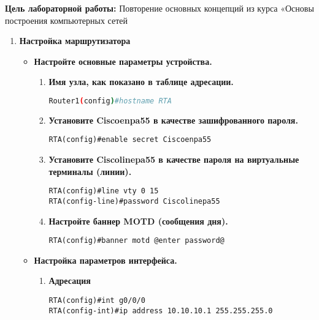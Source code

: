 \documentclass[a4paper,14pt]{extarticle}
\begin{document}
    \textbf{Цель лабораторной работы:}
    Повторение основных концепций из курса «Основы построения компьютерных сетей
    

    \begin{enumerate}
        \item \textbf{Настройка маршрутизатора}
        \begin{itemize}
                \item \textbf{Настройте основные параметры устройства.}
                \begin{enumerate}
                        \item \textbf{Имя узла, как показано в таблице адресации.} 
                                \begin{lstlisting}[language=bash]
Router1(config)#hostname RTA
                                \end{lstlisting}
                        \item \textbf{Установите Ciscoenpa55 в качестве зашифрованного пароля.} 
                                \begin{lstlisting}
RTA(config)#enable secret Ciscoenpa55 
                                \end{lstlisting}
                        \item \textbf{Установите Ciscolinepa55 в качестве пароля на виртуальные терминалы (линии).} 
                                \begin{lstlisting}
RTA(config)#line vty 0 15
RTA(config-line)#password Ciscolinepa55 
                                \end{lstlisting}
                        \item \textbf{Настройте баннер MOTD (сообщения дня).} 
                                \begin{lstlisting}
RTA(config)#banner motd @enter password@
                                \end{lstlisting}
               \end{enumerate}
               \item \textbf{Настройка параметров интерфейса.}
                        \begin{enumerate}
                            \item \textbf{Адресация}
                                \begin{lstlisting}
RTA(config)#int g0/0/0
RTA(config-int)#ip address 10.10.10.1 255.255.255.0
                                \end{lstlisting}

\end{enumerate}
\end{itemize}
\end{enumerate}
\end{document}
